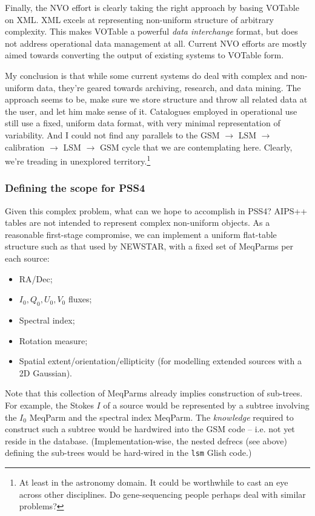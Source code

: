 \documentclass[]{lofar}
\begin{document}
  Finally, the NVO effort is clearly taking the right approach by basing VOTable
  on XML. XML excels at representing non-uniform structure of arbitrary
  complexity. This makes VOTable a powerful {\em data interchange} format, but
  does not address operational data management at all. Current NVO efforts are
  mostly aimed towards converting the output of existing systems to VOTable form.
  
  My conclusion is that while some current systems do deal with complex and
  non-uniform data, they're geared towards archiving, research, and data mining.
  The approach seems to be, make sure we store structure and throw all related
  data at the user, and let him make sense of it. Catalogues employed in
  operational use still use a fixed, uniform data format, with very minimal
  representation of variability. And I could not find any parallels to the GSM
  $\rightarrow$ LSM $\rightarrow$ calibration $\rightarrow$ LSM $\rightarrow$ GSM
  cycle that we are contemplating here. Clearly, we're treading in unexplored
  territory.\footnote{At least in the astronomy domain. It could be worthwhile to
  cast an eye across other disciplines. Do gene-sequencing people perhaps deal
  with similar problems?}
  
\subsubsection{Defining the scope for PSS4 \label{pss4scope}}
  
  Given this complex problem, what can we hope to accomplish in PSS4? AIPS++
  tables are not intended to represent complex non-uniform objects. As a
  reasonable first-stage compromise, we can implement a uniform flat-table
  structure such as that used by NEWSTAR, with a fixed set of MeqParms per each
  source: 
  
  \begin{itemize}
  \item RA/Dec;
  \item $I_0,Q_0,U_0,V_0$ fluxes;
  \item Spectral index;
  \item Rotation measure;
  \item Spatial extent/orientation/ellipticity (for modelling extended sources with a 
  2D Gaussian).
  \end{itemize}
  
  Note that this collection of MeqParms already implies construction of
  sub-trees. For example, the Stokes $I$ of a source would be represented by a
  subtree involving the $I_0$ MeqParm and the spectral index MeqParm. The {\em
  knowledge} required to construct such a subtree would be hardwired into the
  GSM code -- i.e. not yet reside in the database. (Implementation-wise, the
  nested defrecs (see above) defining the sub-trees would be hard-wired in the
  {\tt lsm} Glish code.)
  
\end{document}
